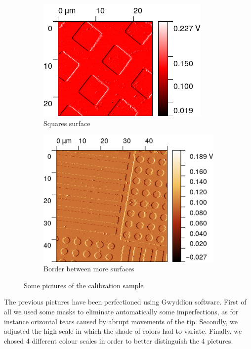 \documentclass[11pt,a4paper]{article}
\begin{document}
\begin{figure}[H]
\begin{subfigure}[b]{0.45\textwidth}
\includegraphics[width=\textwidth]{sm_squares}
\caption{Squares surface}
\label{fig:sm_squares}
\end{subfigure}
\begin{subfigure}[b]{0.45\textwidth}
\includegraphics[width=\textwidth]{sm_border}
\caption{Border between more surfaces}
\label{fig:sm_border}
\end{subfigure}
\caption{Some pictures of the calibration sample}
\end{figure}

The previous pictures have been perfectioned using Gwyddion software. First of all we used some masks to eliminate automatically some imperfections, as for instance orizontal tears caused by abrupt movements of the tip. Secondly, we adjusted the high scale in which the shade of colors had to variate. Finally, we chosed 4 different colour scales in order to better distinguish the 4 pictures.
\end{document}
